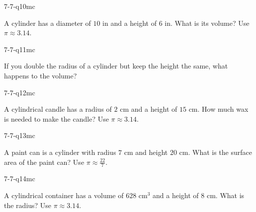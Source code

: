 \begin{practiceQuestion}{7-7-q10}{mc}
\begin{questionText}
A cylinder has a diameter of $10$ in and a height of $6$ in. What is its volume? Use $\pi \approx 3.14$.
\end{questionText}
\end{practiceQuestion}

\begin{practiceQuestion}{7-7-q11}{mc}
\begin{questionText}
If you double the radius of a cylinder but keep the height the same, what happens to the volume?
\end{questionText}
\end{practiceQuestion}

\begin{practiceQuestion}{7-7-q12}{mc}
\begin{questionText}
A cylindrical candle has a radius of $2$ cm and a height of $15$ cm. How much wax is needed to make the candle? Use $\pi \approx 3.14$.
\end{questionText}
\end{practiceQuestion}

\begin{practiceQuestion}{7-7-q13}{mc}
\begin{questionText}
A paint can is a cylinder with radius $7$ cm and height $20$ cm. What is the surface area of the paint can? Use $\pi \approx \frac{22}{7}$.
\end{questionText}
\end{practiceQuestion}

\begin{practiceQuestion}{7-7-q14}{mc}
\begin{questionText}
A cylindrical container has a volume of $628$ cm$^3$ and a height of $8$ cm. What is the radius? Use $\pi \approx 3.14$.
\end{questionText}
\end{practiceQuestion}

